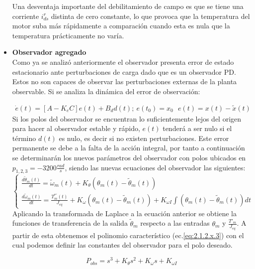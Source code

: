 \documentclass[10pt]{article}
\begin{document}
\begin{itemize}
	Una desventaja importante del debilitamiento de campo es que se tiene una corriente $i^{r}_{ds}$ distinta de cero constante, lo que provoca que la temperatura del motor suba más rápidamente a comparación cuando esta es nula que la temperatura prácticamente no varía.
	\newpage
	\item \textbf{Observador agregado}\\
	Como ya se analizó anteriormente el observador presenta error de estado estacionario ante perturbaciones de carga dado que es un observador PD. 
	Estos no son capaces de observar las perturbaciones externas de la planta observable. Si se analiza la dinámica del error de observación:

	\begin{eqnarray}
		\dot{e}(t)=[A-K_{e}C]e(t)+B_{d}d(t); \ e(t_{0})=x_{0}  \ \ \
		e(t)=x(t)-\tilde{x}(t)
		\label{eq:2.1.2.x.1}
	\end{eqnarray}
	Si los polos del observador se encuentran lo suficientemente lejos del origen para hacer al observador estable y rápido, $e(t)$ tenderá a ser nulo si el término $d(t)$ es nulo, es decir si no existen perturbaciones.
	Este error permanente se debe a la falta de la acción integral, por tanto a continuación se determinarán los nuevos parámetros del observador con polos ubicados en $p_{1,2,3}=-3200 \frac{rad}{s}$, siendo las nuevas ecuaciones del observador las siguientes:
	\begin{equation}
		\left\{\begin{matrix}
			\frac{d\tilde{\theta}_{m}(t)}{dt}=\tilde{\omega}_{m}(t)+K_{\theta}(\theta_{m}(t)-\tilde{\theta}_{m}(t))\\
			\frac{d\tilde{\omega}_{m}(t)}{dt}=\frac{T^{*'}_{m}(t)}{J_{eq}}+K_{\omega}(\theta_{m}(t)-\tilde{\theta}_{m}(t))+K_{\omega I}\int (\theta_{m}(t)-\tilde{\theta}_{m}(t))dt
			
			\end{matrix}\right.
			\label{eq:2.1.2.x.2}
	\end{equation}
	Aplicando la transformada de Laplace a la ecuación anterior se obtiene la funciones de transferencia de la salida $\tilde{\theta}_{m}$ respecto a las entradas $\theta_{m}$ y $\frac{T'_{m}}{J_{eq}}$. A partir de esta obtenemos el polinomio característico (ec.\ref{eq:2.1.2.x.3}) con el cual podemos definir las constantes del observador para el polo deseado.

		\begin{equation}
		P_{obs}=s^{3}+K_{\theta}s^{2}+K_{\omega}s+K_{\omega I}
			\label{eq:2.1.2.x.3}
	\end{equation}


\end{itemize}
\end{document}
